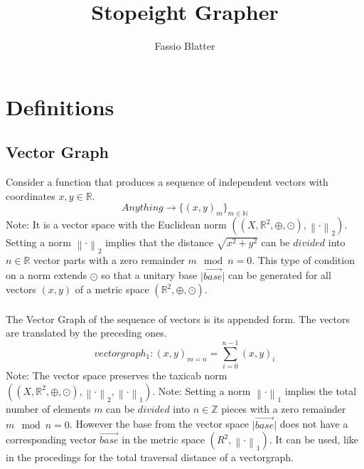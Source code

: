 \documentclass{report}
\newcommand\norm[1]{\left\lVert#1\right\rVert}
\begin{document}
\title{Stopeight Grapher}
\author{Fassio Blatter}
\maketitle

\chapter{Definitions}
\section{Vector Graph}
Consider a function that produces a sequence of independent vectors with coordinates $x,y \in \mathbb{R}$.
\begin{equation}
Anything \rightarrow \{(x,y)_{m}\}_{m \in \mathbb{N}}
\end{equation}
Note: It is a vector space with the Euclidean norm $((X,\mathbb{R}^2,\oplus,\odot),\norm{\cdot}_2)$. Setting a norm $\norm{\cdot}_2$ implies that the distance $\sqrt{x^2+y^2}$ can be $divided$ into $n \in \mathbb{R}$ vector parts with a zero remainder $m \mod n = 0$. This type of condition on a norm extends $\odot$ so that a unitary base $\lvert \overrightarrow{base} \rvert$ can be generated for all vectors $(x,y)$ of a metric space $(\mathbb{R}^2,\oplus,\odot)$.\\\\
The Vector Graph of the sequence of vectors is its appended form. The vectors are translated by the preceding ones.\\
\begin{equation}
vectorgraph_{1}: (x,y)_{m=n}=\sum_{i=0}^{n-1} (x,y)_{i}
\end{equation}
Note: The vector space preserves the taxicab norm $((X,\mathbb{R}^2,\oplus,\odot),\norm{\cdot}_2,\norm{\cdot}_1)$.
Note: Setting a norm $\norm{\cdot}_1$ implies the total number of elements $m$ can be $divided$ into $n \in \mathbb{Z}$ pieces with a zero remainder $m \mod n = 0$. However the base from the vector space $\lvert \overrightarrow{base} \rvert$ does not have a corresponding vector $\overrightarrow{base}$ in the metric space $(R^2,\norm{\cdot}_{1})$. It can be used, like in the procedings for the total traversal distance of a vectorgraph.
\end{document}
